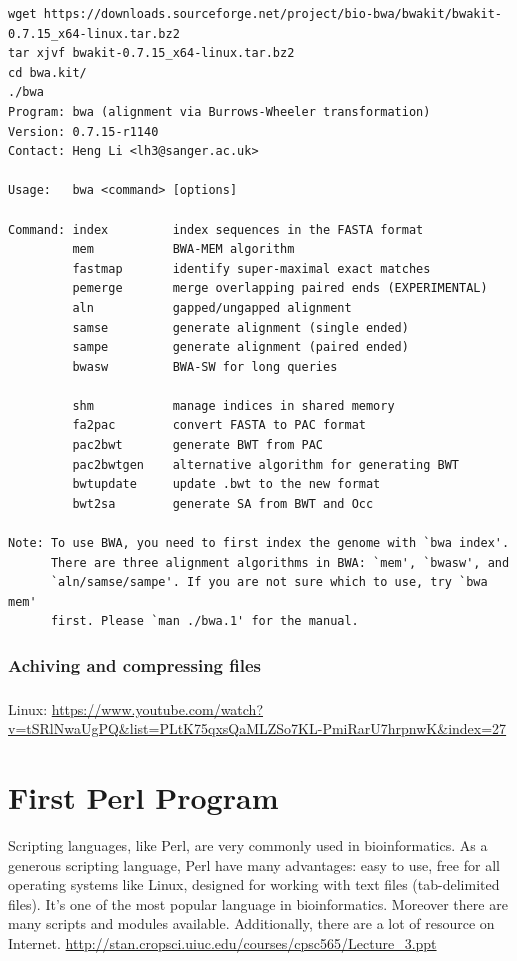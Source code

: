 \documentclass[]{book}
\theoremstyle{definition}
\theoremstyle{definition}
\theoremstyle{definition}
\theoremstyle{remark}
\begin{document}
\begin{verbatim}
wget https://downloads.sourceforge.net/project/bio-bwa/bwakit/bwakit-0.7.15_x64-linux.tar.bz2
tar xjvf bwakit-0.7.15_x64-linux.tar.bz2
cd bwa.kit/
./bwa
Program: bwa (alignment via Burrows-Wheeler transformation)
Version: 0.7.15-r1140
Contact: Heng Li <lh3@sanger.ac.uk>

Usage:   bwa <command> [options]

Command: index         index sequences in the FASTA format
         mem           BWA-MEM algorithm
         fastmap       identify super-maximal exact matches
         pemerge       merge overlapping paired ends (EXPERIMENTAL)
         aln           gapped/ungapped alignment
         samse         generate alignment (single ended)
         sampe         generate alignment (paired ended)
         bwasw         BWA-SW for long queries

         shm           manage indices in shared memory
         fa2pac        convert FASTA to PAC format
         pac2bwt       generate BWT from PAC
         pac2bwtgen    alternative algorithm for generating BWT
         bwtupdate     update .bwt to the new format
         bwt2sa        generate SA from BWT and Occ

Note: To use BWA, you need to first index the genome with `bwa index'.
      There are three alignment algorithms in BWA: `mem', `bwasw', and
      `aln/samse/sampe'. If you are not sure which to use, try `bwa mem'
      first. Please `man ./bwa.1' for the manual.
\end{verbatim}

\subsection{Achiving and compressing
files}\label{achiving-and-compressing-files}

\subsection{}\label{section-1}

Linux:
\url{https://www.youtube.com/watch?v=tSRlNwaUgPQ\&list=PLtK75qxsQaMLZSo7KL-PmiRarU7hrpnwK\&index=27}

\chapter{First Perl Program}\label{first-perl-program}

Scripting languages, like Perl, are very commonly used in
bioinformatics. As a generous scripting language, Perl have many
advantages: easy to use, free for all operating systems like Linux,
designed for working with text files (tab-delimited files). It's one of
the most popular language in bioinformatics. Moreover there are many
scripts and modules available. Additionally, there are a lot of resource
on Internet.
\url{http://stan.cropsci.uiuc.edu/courses/cpsc565/Lecture_3.ppt}
\end{document}
